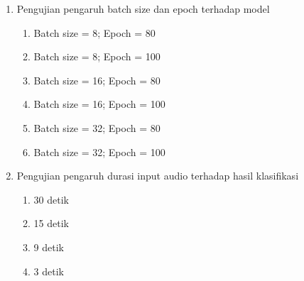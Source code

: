 \begin{enumerate}
	\item Pengujian pengaruh batch size dan epoch terhadap model
	\begin{enumerate}
		\item Batch size = 8; Epoch = 80
		\item Batch size = 8; Epoch = 100
		\item Batch size = 16; Epoch = 80
		\item Batch size = 16; Epoch = 100
		\item Batch size = 32; Epoch = 80
		\item Batch size = 32; Epoch = 100
	\end{enumerate}
	
	\item Pengujian pengaruh durasi input audio terhadap hasil klasifikasi
	\begin{enumerate}
		\item 30 detik
		\item 15 detik
		\item 9 detik
		\item 3 detik
	\end{enumerate}
	
\end{enumerate}